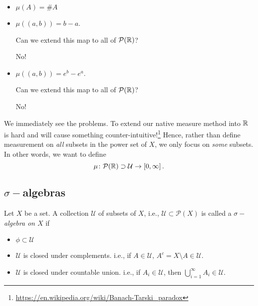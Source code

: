 \begin{eg}
\begin{enumerate}
		      \begin{itemize}
			      \item \(\mu(A) = \# A\)
			      \item \(\mu(\left(a, b\right)) = b-a\).
			            \begin{problem}
			            Can we extend this map to all of \(\mathcal{P}(\mathbb{\MakeUppercase{R}} )\)?
			            \begin{answer}
				            No!
			            \end{answer}
			            \end{problem}
			      \item \(\mu(\left(a, b\right)) = e^b - e^a\).
			            \begin{problem}
			            Can we extend this map to all of \(\mathcal{P}(\mathbb{\MakeUppercase{R}} )\)?
			            \begin{answer}
				            No!
			            \end{answer}
			            \end{problem}
		      \end{itemize}
	\end{enumerate}
\end{eg}

We immediately see the problems. To extend our native measure method into \(\mathbb{\MakeUppercase{R}} \) is hard and will cause something counter-intuitive!\footnote{\url{https://en.wikipedia.org/wiki/Banach-Tarski_paradox}}
Hence, rather than define measurement on \emph{all} subsets in the power set of \(X\), we only focus on \emph{some} subsets. In other words, we
want to define
\[
	\mu\colon \mathcal{P}(\mathbb{\MakeUppercase{R}} )\supset\mathcal{U} \to \left[0, \infty\right].
\]

\subsection{\(\sigma-\)algebras}
\begin{definition}
	Let \(X\) be a set. A collection \(\mathcal{U} \) of subsets of \(X\), i.e., \(\mathcal{U}\subset \mathcal{P} (X) \) is called a \emph{\(\sigma-\)algebra on \(X\)} if
	\begin{itemize}
		\item \(\phi\subset \mathcal{U} \)
		\item \(\mathcal{U} \) is closed under complements. i.e., if \(A\in \mathcal{U} \), \(A^c = X\setminus A\in \mathcal{U} \).
		\item \(\mathcal{U} \) is closed under countable union. i.e., if \(A_i\in \mathcal{U} \), then \(\bigcup\limits_{i=1}^{\infty} A_{i}\in \mathcal{U} \).
	\end{itemize}
\end{definition}

